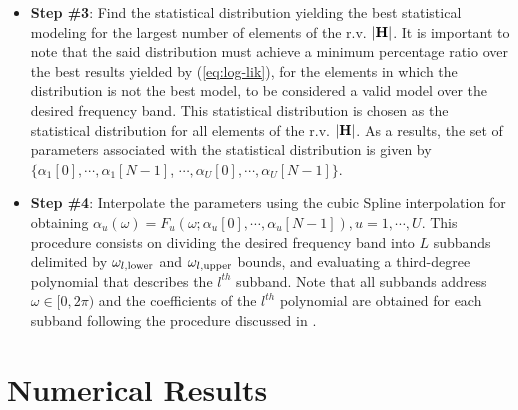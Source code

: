 \documentclass[journal]{IEEEtran}
\begin{document}
\begin{itemize}
	\item \textbf{Step \#3}: Find the statistical distribution yielding the best statistical modeling for the largest number of elements of the \ac{r.v.} $\bf |H|$. It is important to note that the said distribution must achieve a minimum percentage ratio over the best results yielded by (\ref{eq:log-lik}), for the elements in which the distribution is not the best model, to be considered a valid model over the desired frequency band. This statistical distribution is chosen as the statistical distribution for all elements of the \ac{r.v.} $\bf |H|$. As a results, the set of parameters associated with the statistical distribution is given by $\{\alpha_{1}[0], \cdots, \alpha_{1}[N-1]$,   $\cdots, \alpha_{U}[0], \cdots, \alpha_{U}[N-1]\}$.

    \item \textbf{Step \#4}: Interpolate the parameters using the cubic Spline interpolation for obtaining $\alpha_u (\omega) = F_u(\omega; \alpha_{u}[0], \cdots, \alpha_{u}[N-1]), u=1,\cdots,U$. This procedure consists on dividing the desired frequency band into $L$ subbands delimited by $\omega_{l,\textnormal{lower}}$ and $\omega_{l,\textnormal{upper}}$ bounds, and evaluating a third-degree polynomial that describes the $l^{th}$ subband. Note that all subbands address $\omega \in [0,2\pi)$ and the coefficients of the $l^{th}$ polynomial are obtained for each subband following the procedure discussed in \cite{ENA,CS1}.      
\end{itemize}


\section{Numerical Results}
\end{document}
